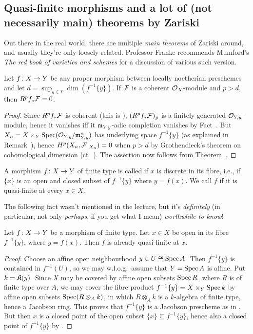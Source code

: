 \documentclass[a4paper,parskip=half,numbers=enddot, DIV=12]{scrreprt}
\begin{document}
\subsection{Quasi-finite morphisms and a lot of (not necessarily main) theorems by Zariski}
Out there in the real world, there are multiple \emph{main theorems} of Zariski around, and usually they're only loosely related. Professor Franke recommends Mumford's \emph{The red book of varieties and schemes} for a discussion of various such version.
\begin{cor}
	Let $f\colon X\morphism Y$ be any proper morphism between locally noetherian preschemes and let $d=\sup_{y\in Y}\dim \left(f^{-1}\{y\}\right)$. If $\mathcal{F}$ is a coherent $\mathcal{O}_X$-module and $p>d$, then $R^pf_*\mathcal{F}=0$.
\end{cor}
\begin{proof}
	Since $R^pf_*\mathcal{F}$ is coherent (this is \cite[Theorem~5]{alggeo2}), $(R^pf_*\mathcal{F})_y$ is a finitely generated $\mathcal{O}_{Y,y}$-module, hence it vanishes iff it $\mathfrak{m}_{Y,y}$-adic completion vanishes by Fact~. But $X_n=X\times_Y\operatorname{Spec} (\mathcal{O}_{Y,y}/\mathfrak{m}_{Y,y}^n)$ has underlying space $f^{-1}\{y\}$ (as explained in Remark~), hence $H^p(X_n,\mathcal{F}|_{X_n})=0$ when $p>d$ by Grothendieck's theorem on cohomological dimension (cf.\ \cite[Proposition~1.4.1]{alggeo2}). The assertion now follows from Theorem~.
\end{proof}
\begin{defi}
	A morphism $f\colon X\morphism Y$ of finite type is called  if $x$ is discrete in its fibre, i.e., if $\{x\}$ is an open and closed subset of $f^{-1}\{y\}$ where $y=f(x)$. We call $f$  if it is quasi-finite at every $x\in X$. 
\end{defi}
The following fact wasn't mentioned in the lecture, but it's \emph{definitely} (in particular, not only \emph{perhaps}, if you get what I mean) \emph{worthwhile to know}!
\begin{fact}
	Let $f\colon X\morphism Y$ be a morphism of finite type. Let $x\in X$ be open in its fibre $f^{-1}\{y\}$, where $y=f(x)$. Then $f$ is already quasi-finite at $x$. 
\end{fact}
\begin{proof}
	Choose an affine open neighbourhood $y\in U\cong \operatorname{Spec} A$. Then $f^{-1}\{y\}$ is contained in $f^{-1}(U)$, so we may w.l.o.g.\ assume that $Y=\operatorname{Spec} A$ is affine. Put $k=\mathfrak{K}(y)$. Since $X$ may be covered by affine open subsets $\operatorname{Spec} R$, where $R$ is of finite type over $A$, we may cover the fibre product $f^{-1}\{y\}=X\times_Y\operatorname{Spec} k$ by affine open subsets $\operatorname{Spec} (R\otimes_A k)$, in which $R\otimes_A k$ is a $k$-algebra of finite type, hence a Jacobson ring. This proves that $f^{-1}\{y\}$ is a Jacobson prescheme as in \cite[Definition~2.4.2]{alggeo1}. But then $x$ is a closed point of the open subset $\{x\}\subseteq f^{-1}\{y\}$, hence also a closed point of $f^{-1}\{y\}$ by \cite[Fact~2.4.1]{alggeo1}.
\end{proof}
\end{document}
